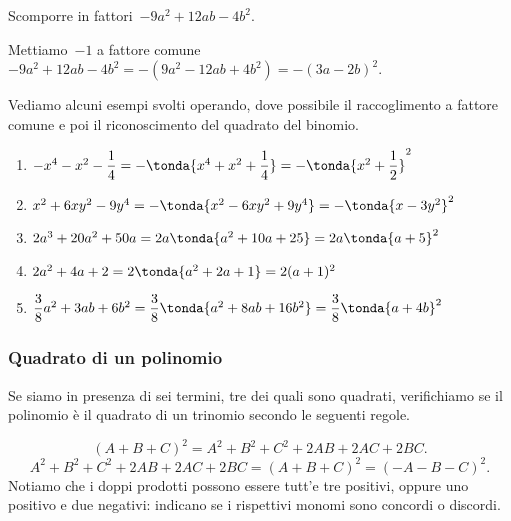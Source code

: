  \begin{esempio}
Scomporre in fattori~\(-9a^{2}+12{ab}-4b^{2}\).

Mettiamo~\(-1\) a fattore comune
\(-9a^{2}+12ab-4b^{2}=-(9a^{2}-12{ab}+4b^{2})=-(3a-2b)^{2}\).
 \end{esempio}

 \begin{esempio}
Vediamo alcuni esempi svolti operando, dove possibile il raccoglimento a 
fattore comune e poi il riconoscimento del quadrato del binomio.

\begin{enumerate}
\item 
\(-x^{4}-x^{2}-\dfrac{1}{4}=-\tonda{x^{4}+x^{2}+\dfrac{1}{4}}=
  -\tonda{x^{2}+\dfrac{1}{2}}^{2}\)
\item 
\(x^{2}+6xy^{2}-9y^{4}=-\tonda{x^{2}-6xy^{2}+9y^{4}}=
  -\tonda{x-3y^{2}}^{2}\)
\item 
\(2a^{3}+20a^{2}+50a=2a\tonda{a^{2}+10a+25}=2a\tonda{a+5}^{2}\)
\item 
\(2a^{2}+4a+2=2\tonda{a^{2}+2a+1}=2(a+1)^{2}\)
\item 
\(\dfrac{3}{8}a^{2}+3ab+6b^{2}=
  \dfrac{3}{8}\tonda{a^{2}+8ab+16b^{2} }=
  \dfrac{3}{8}\tonda{a+4b}^{2}\)
\end{enumerate}
\end{esempio}


\subsubsection{Quadrato di un polinomio}
\label{subsubsec:divpol_quadpol}

Se siamo in presenza di sei termini, tre dei quali sono quadrati, 
verifichiamo se il polinomio è il quadrato di un trinomio secondo le seguenti 
regole.

\begin{equation*}
(A+B+C)^{2}=A^{2}+B^{2}+C^{2}+2AB+2AC+2BC.
\end{equation*}
\begin{equation*}
A^{2}+B^{2}+C^{2}+2AB+2AC+2BC=(A+B+C)^{2}=(-A-B-C)^{2}.
\end{equation*}
Notiamo che i doppi prodotti possono essere tutt'e tre positivi, oppure uno 
positivo e due negativi: indicano se i rispettivi monomi sono concordi o 
discordi.

